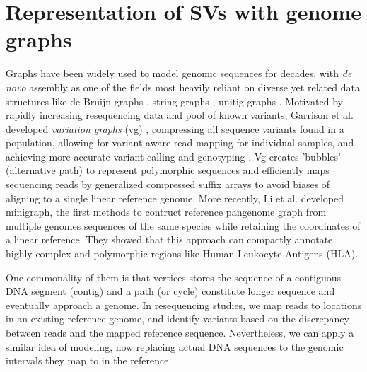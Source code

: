 \documentclass[phd,tocprelim]{cornell}
\begin{document}
\section{Representation of SVs with genome graphs}
Graphs have been widely used to model genomic sequences for decades, with \textit{de novo} assembly as one of the fields most heavily reliant on diverse yet related data structures like de Bruijn graphs \cite{Zerbino2008-cc}, string graphs \cite{Simpson2010-xe}, unitig graphs \cite{Li2012-ac}. Motivated by rapidly increasing resequencing data and pool of known variants, Garrison et al. developed \textit{variation graphs} (vg) \cite{Garrison2018-sj}, compressing all sequence variants found in a population, allowing for variant-aware read mapping for individual samples, and achieving more accurate variant calling and genotyping \cite{Hickey2020-cu,Siren2020-tf}. Vg creates 'bubbles' (alternative path) to represent polymorphic sequences and efficiently maps sequencing reads by generalized compressed suffix arrays to avoid biases of aligning to a single linear reference genome. More recently, Li et al. \cite{Li2020-ai} developed minigraph, the first methods to contruct reference pangenome graph from multiple genomes sequences of the same species while retaining the coordinates of a linear reference. They showed that this approach can compactly annotate highly complex and polymorphic regions like Human Leukocyte Antigens (HLA).


One commonality of them is that vertices stores the sequence of a contiguous DNA segment (contig) and a path (or cycle) constitute longer sequence and eventually approach a genome. In resequencing studies, we map reads to locations in an existing reference genome, and identify variants based on the discrepancy between reads and the mapped reference sequence. Nevertheless, we can apply a similar idea of modeling, now replacing actual DNA sequences to the genomic intervals they map to in the reference.
\end{document}
